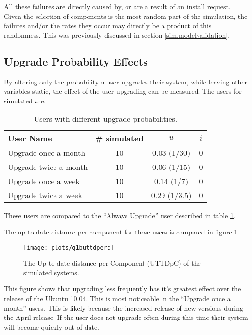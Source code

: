 All these failures are directly caused by, or are a result of an install request.
Given the selection of components is the most random part of the simulation, the failures and/or the rates they occur may directly be a product of this randomness.
This was previously discussed in section \ref{sim.modelvalidation}.


\subsection{Upgrade Probability Effects}
By altering only the probability a user upgrades their system, while leaving other variables static, the effect of the user upgrading can be measured.
The users for simulated are:
\begin{table}[h!]
\centering
\begin{tabular}{|l | c | c | c |}
\hline
User Name 				& \# simulated 	& $u$ 		& $i$ 			\\ \hline
Upgrade once a month	& 10 			& 0.03 (1/30)			& 0				 \\
Upgrade twice a month	& 10 			& 0.06 (1/15)		& 0				\\
Upgrade once a week		& 10 			& 0.14 (1/7)		& 0				 \\
Upgrade twice a week 	& 10 			& 0.29 (1/3.5)		& 0				\\ \hline
\end{tabular}
\caption{Users with different upgrade probabilities.}
\label{exp.tblextremeusers}
\end{table}
These users are compared to the ``Always Upgrade'' user described in table \ref{exp.tblextremeusers}.

The up-to-date distance per component for these users is compared in figure \ref{exp.q1buttdperc}.
\begin{figure}[htp]
\begin{center}
  \texttt{[image: plots/q1buttdperc]}
  \caption{The Up-to-date distance per Component (UTTDpC) of the simulated systems.}
  \label{exp.q1buttdperc}
\end{center}
\end{figure}

This figure shows that upgrading less frequently has it's greatest effect over the release of the Ubuntu 10.04.
This is most noticeable in the ``Upgrade once a month'' users.
This is likely because the increased release of new versions during the April release.
If the user does not upgrade often during this time their system will become quickly out of date.

